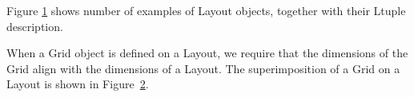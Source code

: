 Figure \ref{fig:layouts} shows number of examples of Layout objects,
together with their Ltuple description.

\begin{figure}

\label{fig:layouts}
\end{figure}

When a Grid object is defined on a Layout, we require that the dimensions 
of the Grid align with the dimensions of a Layout.  The superimposition
of a Grid on a Layout is shown in Figure~\ref{fig:gridlayout}.

\begin{figure}
\label{fig:gridlayout}
\end{figure}

